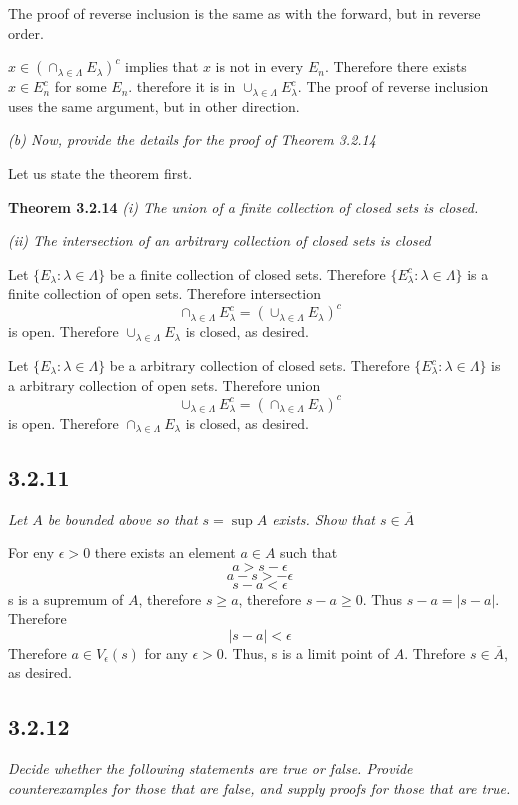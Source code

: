 \documentclass[11pt,oneside,titlepage]{book}
\begin{document}
The proof of reverse inclusion is the same as with the forward, but in reverse
order.

$x \in \left(\cap_{\lambda \in \Lambda} E_\lambda \right)^c$ implies that
$x$ is not in every $E_n$. Therefore there exists $x \in E_n^c$ for some $E_n$.
therefore it is in $\cup_{\lambda \in \Lambda} E_\lambda^c$. The proof of
reverse inclusion uses the same argument, but in other direction.

\textit{(b) Now, provide the details for the proof of Theorem 3.2.14}

Let us state the theorem first.

\textbf{Theorem 3.2.14}
\textit{(i) The union of a finite collection of closed sets is closed.}

\textit{(ii) The intersection of an arbitrary collection of closed sets is closed}

Let $\{E_\lambda: \lambda \in \Lambda\}$ be a finite collection of closed sets.
Therefore $\{E_\lambda^c: \lambda \in \Lambda\}$ is a finite collection of open
sets. Therefore intersection
$$\cap_{\lambda \in \Lambda} E_\lambda^c = (\cup_{\lambda \in \Lambda} E_\lambda)^c$$
is open. Therefore $\cup_{\lambda \in \Lambda} E_\lambda$ is closed, as desired.

Let $\{E_\lambda: \lambda \in \Lambda\}$ be a arbitrary collection of closed sets.
Therefore $\{E_\lambda^c: \lambda \in \Lambda\}$ is a arbitrary collection of open
sets. Therefore union
$$\cup_{\lambda \in \Lambda} E_\lambda^c = (\cap_{\lambda \in \Lambda} E_\lambda)^c$$
is open. Therefore $\cap_{\lambda \in \Lambda} E_\lambda$ is closed, as desired.

\subsection*{3.2.11}
\textit{Let $A$ be bounded above so that $s = \sup A$ exists. Show that
  $s \in \overline A$}

For eny $\epsilon > 0$ there exists an element $a \in A$ such that
$$a > s - \epsilon$$
$$a - s > - \epsilon$$
$$s - a < \epsilon$$
s is a supremum of $A$, therefore $s \geq a$, therefore $s - a \geq 0$. Thus
$s - a = |s - a|$. Therefore 
$$|s - a| < \epsilon$$
Therefore $a \in V_\epsilon(s)$ for any $\epsilon > 0$. Thus, s is a limit point of
$A$. Threfore $s \in \overline A$, as desired.

\subsection*{3.2.12}
\textit{Decide whether the following statements are true or false. Provide counterexamples for those that are false, and supply proofs for those that are true.}
\end{document}
